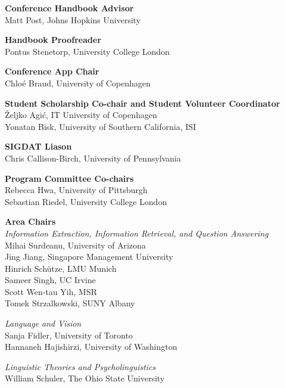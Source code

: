 \documentclass[11pt]{article}
\begin{document}
{\bf Conference Handbook Advisor}\\
Matt Post, Johns Hopkins University

{\bf Handbook Proofreader}\\
Pontus Stenetorp, University College London

{\bf Conference App Chair}\\
Chloé Braud, University of Copenhagen

{\bf Student Scholarship Co-chair and Student Volunteer Coordinator}\\
Željko Agić, IT University of Copenhagen\\
Yonatan Bisk, University of Southern California, ISI

{\bf SIGDAT Liason}\\
Chris Callison-Birch, University of Pennsylvania

\vspace*{0.5cm}

{\bf Program Committee Co-chairs} \\
Rebecca Hwa, University of Pittsburgh \\
Sebastian Riedel, University College London

{\bf Area Chairs} \\
\emph{Information Extraction, Information Retrieval, and Question Answering} \\
\hspace*{0.2in} Mihai Surdeanu, University of Arizona \\
\hspace*{0.2in} Jing Jiang, Singapore Management University \\
\hspace*{0.2in} Hinrich Schütze, LMU Munich \\
\hspace*{0.2in} Sameer Singh, UC Irvine \\
\hspace*{0.2in} Scott Wen-tau Yih, MSR \\
\hspace*{0.2in} Tomek Strzalkowski, SUNY Albany

\emph{Language and Vision} \\
\hspace*{0.2in} Sanja Fidler, University of Toronto \\
\hspace*{0.2in} Hannaneh Hajishirzi, University of Washington


\emph{Linguistic Theories and Psycholinguistics} \\
\hspace*{0.2in} William Schuler, The Ohio State University
\end{document}
